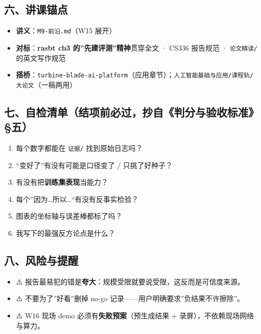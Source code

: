 \documentclass[
  chinese,
  11pt,
]{ctexart}
\providecommand{\tightlist}{%
  \setlength{\itemsep}{0pt}\setlength{\parskip}{0pt}}
\begin{document}
\subsection{六、讲课锚点}\label{ux516dux8bb2ux8bfeux951aux70b9}

\begin{itemize}
\tightlist
\item
  \textbf{讲义}：\texttt{M9-前沿.md}（W15 展开）
\item
  \textbf{对标}：\textbf{rasbt ch3 的''先建评测''精神}贯穿全文 · CS336 报告规范 · \texttt{论文精读/} 的英文写作规范
\item
  \textbf{搭桥}：\texttt{turbine-blade-ai-platform}（应用章节）；\texttt{人工智能基础与应用/课程轨/大论文}（一稿两用）
\end{itemize}

\subsection{七、自检清单（结项前必过，抄自《判分与验收标准》§五）}\label{ux4e03ux81eaux68c0ux6e05ux5355ux7ed3ux9879ux524dux5fc5ux8fc7ux6284ux81eaux5224ux5206ux4e0eux9a8cux6536ux6807ux51c6ux4e94}

\begin{enumerate}
\def\labelenumi{\arabic{enumi}.}
\tightlist
\item
  每个数字都能在 \texttt{证据/} 找到原始日志吗？
\item
  ``变好了''有没有可能是口径变了 / 只挑了好种子？
\item
  有没有把\textbf{训练集表现}当能力？
\item
  每个''因为\ldots 所以\ldots``有没有反事实检验？
\item
  图表的坐标轴与误差棒都标了吗？
\item
  我写下的最强反方论点是什么？
\end{enumerate}

\subsection{八、风险与提醒}\label{ux516bux98ceux9669ux4e0eux63d0ux9192}

\begin{itemize}
\tightlist
\item
  ⚠️ 报告最易犯的错是\textbf{夸大}：规模受限就要说受限，这反而是可信度来源。
\item
  ⚠️ 不要为了''好看''删掉 no-go 记录------用户明确要求''负结果不许擦除''。
\item
  ⚠️ W16 现场 demo 必须有\textbf{失败预案}（预生成结果 + 录屏），不依赖现场网络与算力。
\end{itemize}
\end{document}
